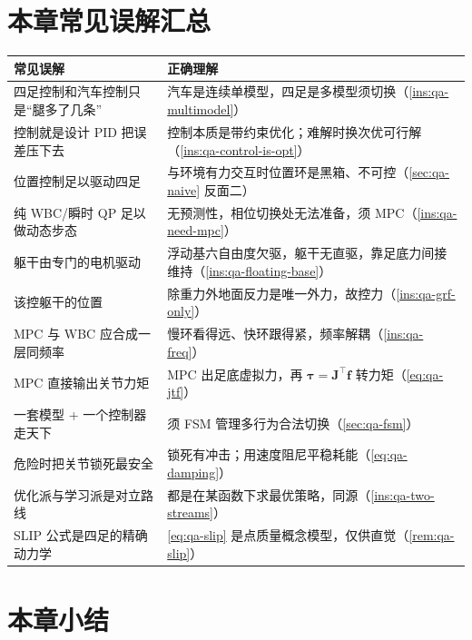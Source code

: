 \section*{本章常见误解汇总}

\begin{table}[H]\centering\small
\begin{tabular}{p{} p{}}
\toprule
\textbf{常见误解} & \textbf{正确理解} \\
\midrule
四足控制和汽车控制只是“腿多了几条” & 汽车是连续单模型，四足是多模型须切换（\cref{ins:qa-multimodel}）\\
控制就是设计 PID 把误差压下去 & 控制本质是带约束优化；难解时换次优可行解（\cref{ins:qa-control-is-opt}）\\
位置控制足以驱动四足 & 与环境有力交互时位置环是黑箱、不可控（\cref{sec:qa-naive} 反面二）\\
纯 WBC/瞬时 QP 足以做动态步态 & 无预测性，相位切换处无法准备，须 MPC（\cref{ins:qa-need-mpc}）\\
躯干由专门的电机驱动 & 浮动基六自由度欠驱，躯干无直驱，靠足底力间接维持（\cref{ins:qa-floating-base}）\\
该控躯干的位置 & 除重力外地面反力是唯一外力，故控力（\cref{ins:qa-grf-only}）\\
MPC 与 WBC 应合成一层同频率 & 慢环看得远、快环跟得紧，频率解耦（\cref{ins:qa-freq}）\\
MPC 直接输出关节力矩 & MPC 出足底虚拟力，再 $\boldsymbol\tau=\mathbf{J}^\top\mathbf{f}$ 转力矩（\cref{eq:qa-jtf}）\\
一套模型 + 一个控制器走天下 & 须 FSM 管理多行为合法切换（\cref{sec:qa-fsm}）\\
危险时把关节锁死最安全 & 锁死有冲击；用速度阻尼平稳耗能（\cref{eq:qa-damping}）\\
优化派与学习派是对立路线 & 都是在某函数下求最优策略，同源（\cref{ins:qa-two-streams}）\\
SLIP 公式是四足的精确动力学 & \cref{eq:qa-slip} 是点质量概念模型，仅供直觉（\cref{rem:qa-slip}）\\
\bottomrule
\end{tabular}
\end{table}

\section*{本章小结}

